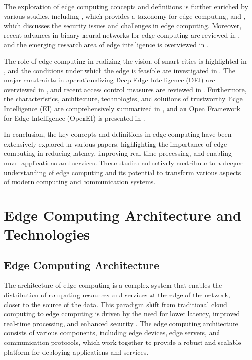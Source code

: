 \documentclass[11pt]{article}
\begin{document}
The exploration of edge computing concepts and definitions is further enriched by various studies, including \cite{ref14}, which provides a taxonomy for edge computing, and \cite{ref15}, which discusses the security issues and challenges in edge computing. Moreover, recent advances in binary neural networks for edge computing are reviewed in \cite{ref16}, and the emerging research area of edge intelligence is overviewed in \cite{ref17}.

The role of edge computing in realizing the vision of smart cities is highlighted in \cite{ref18}, and the conditions under which the edge is feasible are investigated in \cite{ref19}. The major constraints in operationalizing Deep Edge Intelligence (DEI) are overviewed in \cite{ref20}, and recent access control measures are reviewed in \cite{ref21}. Furthermore, the characteristics, architecture, technologies, and solutions of trustworthy Edge Intelligence (EI) are comprehensively summarized in \cite{ref22}, and an Open Framework for Edge Intelligence (OpenEI) is presented in \cite{ref23}.

In conclusion, the key concepts and definitions in edge computing have been extensively explored in various papers, highlighting the importance of edge computing in reducing latency, improving real-time processing, and enabling novel applications and services. These studies collectively contribute to a deeper understanding of edge computing and its potential to transform various aspects of modern computing and communication systems.

\section{Edge Computing Architecture and Technologies}

\subsection{Edge Computing Architecture}

The architecture of edge computing is a complex system that enables the distribution of computing resources and services at the edge of the network, closer to the source of the data. This paradigm shift from traditional cloud computing to edge computing is driven by the need for lower latency, improved real-time processing, and enhanced security \cite{ref1}. The edge computing architecture consists of various components, including edge devices, edge servers, and communication protocols, which work together to provide a robust and scalable platform for deploying applications and services.
\end{document}
